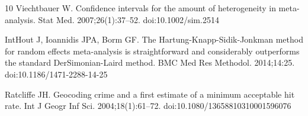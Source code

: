 \documentclass[10pt,letterpaper]{article}
\begin{document}
\begin{thebibliography}{10}
Viechtbauer W.
\newblock Confidence intervals for the amount of heterogeneity in meta-analysis.
\newblock Stat Med. 2007;26(1):37--52.
\newblock doi:10.1002/sim.2514

IntHout J, Ioannidis JPA, Borm GF.
\newblock The Hartung-Knapp-Sidik-Jonkman method for random effects meta-analysis is
straightforward and considerably outperforms the standard DerSimonian-Laird method.
\newblock BMC Med Res Methodol. 2014;14:25.
\newblock doi:10.1186/1471-2288-14-25

Ratcliffe JH.
\newblock Geocoding crime and a first estimate of a minimum acceptable hit rate.
\newblock Int J Geogr Inf Sci. 2004;18(1):61--72.
\newblock doi:10.1080/13658810310001596076

\end{thebibliography}
\end{document}
